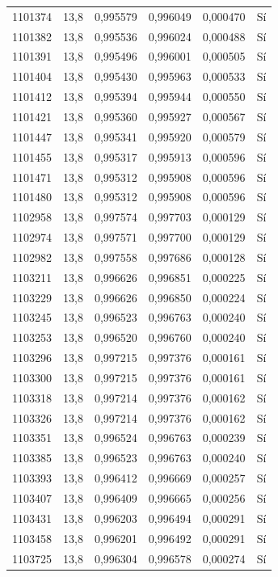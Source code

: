 \begin{longtable}{lccccc}
1101374 & 13,8 & 0,995579 & 0,996049 & 0,000470 & Sí \\
1101382 & 13,8 & 0,995536 & 0,996024 & 0,000488 & Sí \\
1101391 & 13,8 & 0,995496 & 0,996001 & 0,000505 & Sí \\
1101404 & 13,8 & 0,995430 & 0,995963 & 0,000533 & Sí \\
1101412 & 13,8 & 0,995394 & 0,995944 & 0,000550 & Sí \\
1101421 & 13,8 & 0,995360 & 0,995927 & 0,000567 & Sí \\
1101447 & 13,8 & 0,995341 & 0,995920 & 0,000579 & Sí \\
1101455 & 13,8 & 0,995317 & 0,995913 & 0,000596 & Sí \\
1101471 & 13,8 & 0,995312 & 0,995908 & 0,000596 & Sí \\
1101480 & 13,8 & 0,995312 & 0,995908 & 0,000596 & Sí \\
1102958 & 13,8 & 0,997574 & 0,997703 & 0,000129 & Sí \\
1102974 & 13,8 & 0,997571 & 0,997700 & 0,000129 & Sí \\
1102982 & 13,8 & 0,997558 & 0,997686 & 0,000128 & Sí \\
1103211 & 13,8 & 0,996626 & 0,996851 & 0,000225 & Sí \\
1103229 & 13,8 & 0,996626 & 0,996850 & 0,000224 & Sí \\
1103245 & 13,8 & 0,996523 & 0,996763 & 0,000240 & Sí \\
1103253 & 13,8 & 0,996520 & 0,996760 & 0,000240 & Sí \\
1103296 & 13,8 & 0,997215 & 0,997376 & 0,000161 & Sí \\
1103300 & 13,8 & 0,997215 & 0,997376 & 0,000161 & Sí \\
1103318 & 13,8 & 0,997214 & 0,997376 & 0,000162 & Sí \\
1103326 & 13,8 & 0,997214 & 0,997376 & 0,000162 & Sí \\
1103351 & 13,8 & 0,996524 & 0,996763 & 0,000239 & Sí \\
1103385 & 13,8 & 0,996523 & 0,996763 & 0,000240 & Sí \\
1103393 & 13,8 & 0,996412 & 0,996669 & 0,000257 & Sí \\
1103407 & 13,8 & 0,996409 & 0,996665 & 0,000256 & Sí \\
1103431 & 13,8 & 0,996203 & 0,996494 & 0,000291 & Sí \\
1103458 & 13,8 & 0,996201 & 0,996492 & 0,000291 & Sí \\
1103725 & 13,8 & 0,996304 & 0,996578 & 0,000274 & Sí \\

\end{longtable}
